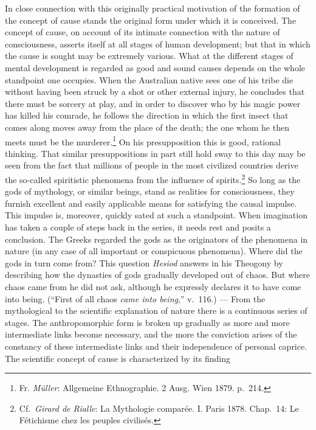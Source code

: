 \documentclass[12pt,a4paper]{book}
\newcommand{\opage}[1]{\marginnote{\footnotesize\textit{[#1]}}}
\begin{document}
In close connection with this originally practical motivation of the
formation of the concept of cause stands the original form under which
it is conceived. The concept of cause, on account of its intimate
connection with the nature of consciousness, asserts itself at all
stages of human development; but that
\opage{262}in which the cause is sought may be extremely various. What
at the different stages of mental development is regarded as good and
sound causes depends on the whole standpoint one occupies. When the
Australian native sees one of his tribe die without having been struck
by a shot or other external injury, he concludes that there must be
sorcery at play, and in order to discover who by his magic power has
killed his comrade, he follows the direction in which the first insect
that comes along moves away from the place of the death; the one whom he
then meets must be the
murderer.\footnote{Fr. \emph{Müller}: Allgemeine Ethnographie. 2 Ausg.
Wien 1879. p.~214.} On his presupposition this is good, rational
thinking. That similar presuppositions in part still hold sway to this
day may be seen from the fact that millions of people in the most
civilized countries derive the so-called spiritistic phenomena from the
influence of
spirits.\footnote{Cf.\ \emph{Girard de Rialle}: La Mythologie comparée.
I. Paris 1878. Chap.~14: Le Fétichisme chez les peuples civilisés.} So
long as the gods of mythology, or similar beings, stand as realities for
consciousness, they furnish excellent and easily applicable means for
satisfying the causal impulse. This impulse is, moreover, quickly sated
at such a standpoint. When imagination has taken a couple of steps back
in the series, it needs rest and posits a conclusion. The Greeks
regarded the gods as the originators of the phenomena in nature (in any
case of all important or conspicuous phenomena). Where did the gods in
turn come from? This question \emph{Hesiod} answers in his Theogony by
describing how the dynasties of gods gradually developed out of chaos.
But where chaos came from he did not ask, although he expressly declares
it to have come into being. (``First of all chaos \emph{came into
being},'' v.~116.) --- From the mythological to the scientific
explanation of nature there is a continuous series of stages. The
anthropomorphic form is broken up gradually as more and more intermediate
links become necessary, and the more the conviction arises of the
constancy of these intermediate links and their independence of personal
caprice. The scientific concept of cause is characterized by its finding
\end{document}
